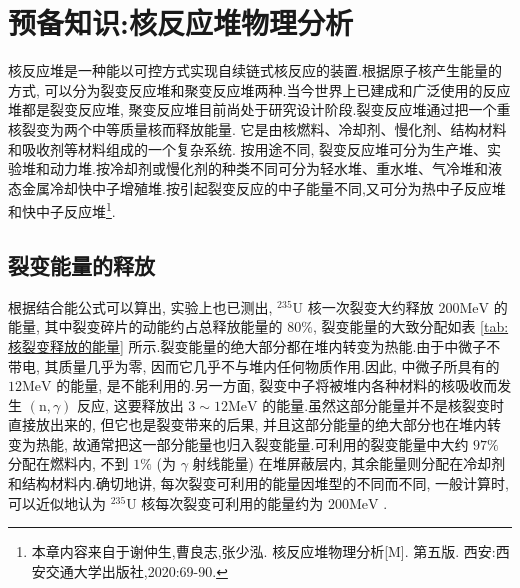 \documentclass{Sichuan Normal University}
\begin{document}

\section{预备知识:核反应堆物理分析}

核反应堆是一种能以可控方式实现自续链式核反应的装置.根据原子核产生能量的方式, 可以分为裂变反应堆和聚变反应堆两种\cite{XieZhongShengHeFanYingDuiWuLiFenXi2020}.当今世界上已建成和广泛使用的反应堆都是裂变反应堆, 聚变反应堆目前尚处于研究设计阶段.裂变反应堆通过把一个重核裂变为两个中等质量核而释放能量.
它是由核燃料、冷却剂、慢化剂、结构材料和吸收剂等材料组成的一个复杂系统.
按用途不同, 裂变反应堆可分为生产堆、实验堆和动力堆.按冷却剂或慢化剂的种类不同可分为轻水堆、重水堆、气冷堆和液态金属冷却快中子增殖堆.按引起裂变反应的中子能量不同,又可分为热中子反应堆和快中子反应堆\footnote{本章内容来自于\cite{XieZhongShengHeFanYingDuiWuLiFenXi2020}谢仲生,曹良志,张少泓. 核反应堆物理分析[M]. 第五版. 西安:西安交通大学出版社,2020:69-90.}.

\subsection{裂变能量的释放}

根据结合能公式可以算出, 实验上也已测出, ${ }^{235} \mathrm{U}$ 核一次裂变大约释放 $200 \mathrm{MeV}$ 的能量,
其中裂变碎片的动能约占总释放能量的 $80 \%$, 裂变能量的大致分配如表 \ref{tab:核裂变释放的能量} 所示.裂变能量的绝大部分都在堆内转变为热能.由于中微子不带电, 其质量几乎为零, 因而它几乎不与堆内任何物质作用.因此, 中微子所具有的 $12 \mathrm{MeV}$ 的能量, 是不能利用的.另一方面, 裂变中子将被堆内各种材料的核吸收而发生 $(\mathrm{n}, \gamma)$ 反应, 这要释放出 $3 \sim 12 \mathrm{MeV}$ 的能量.虽然这部分能量并不是核裂变时直接放出来的, 但它也是裂变带来的后果, 并且这部分能量的绝大部分也在堆内转变为热能, 故通常把这一部分能量也归入裂变能量.可利用的裂变能量中大约 $97 \%$分配在燃料内, 不到 $1 \%$ (为 $\gamma$ 射线能量) 在堆屏蔽层内, 其余能量则分配在冷却剂和结构材料内.确切地讲, 每次裂变可利用的能量因堆型的不同而不同, 一般计算时, 可以近似地认为 ${ }^{235} \mathrm{U}$ 核每次裂变可利用的能量约为 $200 \mathrm{MeV}$ .
\end{document}
